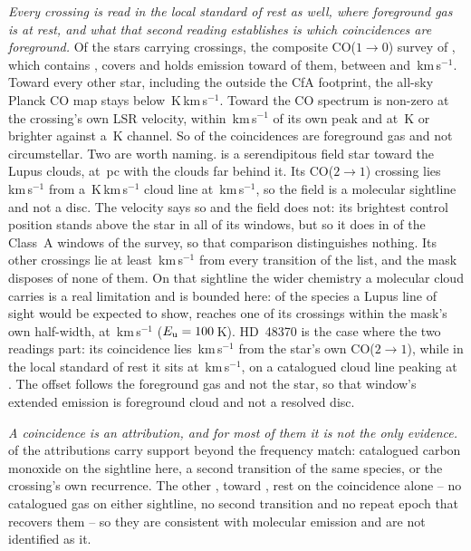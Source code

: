 \emph{Every crossing is read in the local standard of rest as well, where
foreground gas is at rest, and what that second reading establishes is which
coincidences are foreground.} Of the \LsNLos{} stars carrying crossings, the composite
CO($1\to0$) survey of \citet{DameThaddeus2022}, which contains
\citet{Dame2001}, covers \LsNLosCov{} and holds emission toward \LsNLosDet{}
of them, between \LsCoVLo{} and \LsCoVHi\,km\,s$^{-1}$. Toward every other
star, including the \LsNLosOut{} outside the CfA footprint, the all-sky
Planck CO map \citep{PlanckCO2016} stays below
\LsPlanckMax\,K\,km\,s$^{-1}$. Toward
\LsCloudStars{} the CO spectrum is non-zero at the crossing's own LSR
velocity, within \LsCloudDvMax\,km\,s$^{-1}$ of its own peak and at
\LsCloudTMin\,K or brighter against a \LsCoRms\,K channel. So \LsNCloud{} of
the \MkNCoinc{} coincidences are foreground gas and not circumstellar.
Two are worth naming. \BkAlmaName{} is a serendipitous field star toward the
Lupus clouds, at \BkAlmaDistPc\,pc with the clouds far behind it. Its
CO($2\to1$) crossing lies \LsLupDv\,km\,s$^{-1}$ from a
\LsLupWco\,K\,km\,s$^{-1}$ cloud line at \LsLupVco\,km\,s$^{-1}$, so the
field is a molecular sightline and not a disc. The velocity says so and the
field
does not: its brightest control position stands above the star in all
\LsLupNRingLeadWord{} of its windows, but so it does in \LsRingLeadA{} of the
\NWinA{} Class~A windows of the survey, so that comparison
distinguishes nothing. Its other
\LsLupNFar{} crossings lie at least \LsLupFarMin\,km\,s$^{-1}$ from every
transition of the list, and the mask disposes of none of them. On that
sightline the wider chemistry a molecular cloud carries is a real limitation
and is bounded here: of the species a Lupus line of sight would be expected
to show, \XlLupNamedN{} reaches one of its crossings within the mask's own
half-width, \XlLupNamedMol{} at \XlLupNamedDv\,km\,s$^{-1}$
($E_{\rm u}=100$\,K). HD~48370 is
the case where the two readings part: its coincidence lies
\LsHdDvStar\,km\,s$^{-1}$ from the star's own CO($2\to1$), while in the local
standard of rest it sits at \LsHdVfeat\,km\,s$^{-1}$, on a catalogued cloud
line peaking at \LsHdVco. The offset follows the foreground gas and not the
star, so that window's extended emission is foreground cloud and not a
resolved disc.

\emph{A coincidence is an attribution, and for most of them it is not the
only evidence.} \LnAttrSupp{} of the \MkAttr{} attributions carry support
beyond the frequency match: catalogued carbon monoxide on the sightline here,
a second transition of the same species, or the crossing's own recurrence.
The other \LnAttrCoincWord, toward \LnCoincStars, rest on the coincidence
alone -- no catalogued gas on either sightline, no second transition and no
repeat epoch that recovers them -- so they are consistent with molecular
emission and are not identified as it.

